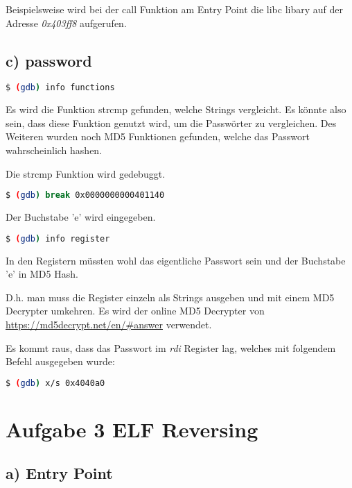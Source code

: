 Beispielsweise wird bei der call Funktion am Entry Point die libc libary auf der Adresse
\textit{0x403ff8} aufgerufen.

\subsection*{c) password}

\begin{lstlisting}[language=bash]
    $ (gdb) info functions
\end{lstlisting}

Es wird die Funktion strcmp gefunden, welche Strings vergleicht. Es könnte also sein, dass
diese Funktion genutzt wird, um die Passwörter zu vergleichen.
Des Weiteren wurden noch MD5 Funktionen gefunden, welche das Passwort wahrscheinlich hashen.

Die strcmp Funktion wird gedebuggt.

\begin{lstlisting}[language=bash]
    $ (gdb) break 0x0000000000401140
\end{lstlisting}

Der Buchstabe 'e' wird eingegeben.

\begin{lstlisting}[language=bash]
    $ (gdb) info register
\end{lstlisting}

In den Registern müssten wohl das eigentliche Passwort sein und der Buchstabe 'e' in MD5 Hash.

D.h. man muss die Register einzeln als Strings ausgeben und mit einem MD5 Decrypter umkehren.
Es wird der online MD5 Decrypter von \url{https://md5decrypt.net/en/#answer} verwendet.

Es kommt raus, dass das Passwort im \textit{rdi} Register lag, welches mit folgendem Befehl ausgegeben wurde:

\begin{lstlisting}[language=bash]
    $ (gdb) x/s 0x4040a0
\end{lstlisting}


\section*{Aufgabe 3 ELF Reversing}

\subsection*{a) Entry Point}

